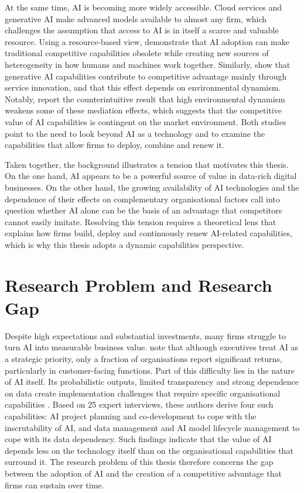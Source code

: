 At the same time, AI is becoming more widely accessible. Cloud services and generative AI make advanced models available to almost any firm, which challenges the assumption that access to AI is in itself a scarce and valuable resource. Using a resource-based view, \textcite[1425]{krakowski2023} demonstrate that AI adoption can make traditional competitive capabilities obsolete while creating new sources of heterogeneity in how humans and machines work together. Similarly, \textcite[10]{li2025} show that generative AI capabilities contribute to competitive advantage mainly through service innovation, and that this effect depends on environmental dynamism. Notably, \textcite[10]{li2025} report the counterintuitive result that high environmental dynamism weakens some of these mediation effects, which suggests that the competitive value of AI capabilities is contingent on the market environment. Both studies point to the need to look beyond AI as a technology and to examine the capabilities that allow firms to deploy, combine and renew it.

Taken together, the background illustrates a tension that motivates this thesis. On the one hand, AI appears to be a powerful source of value in data-rich digital businesses. On the other hand, the growing availability of AI technologies and the dependence of their effects on complementary organisational factors call into question whether AI alone can be the basis of an advantage that competitors cannot easily imitate. Resolving this tension requires a theoretical lens that explains how firms build, deploy and continuously renew AI-related capabilities, which is why this thesis adopts a dynamic capabilities perspective.

\section{Research Problem and Research Gap}
\label{sec:problem}

Despite high expectations and substantial investments, many firms struggle to turn AI into measurable business value. \textcite[1]{alnofeli2026} note that although executives treat AI as a strategic priority, only a fraction of organisations report significant returns, particularly in customer-facing functions. Part of this difficulty lies in the nature of AI itself. Its probabilistic outputs, limited transparency and strong dependence on data create implementation challenges that require specific organisational capabilities \parencite[1549]{weber2023}. Based on 25 expert interviews, these authors derive four such capabilities: AI project planning and co-development to cope with the inscrutability of AI, and data management and AI model lifecycle management to cope with its data dependency. Such findings indicate that the value of AI depends less on the technology itself than on the organisational capabilities that surround it. The research problem of this thesis therefore concerns the gap between the adoption of AI and the creation of a competitive advantage that firms can sustain over time.

